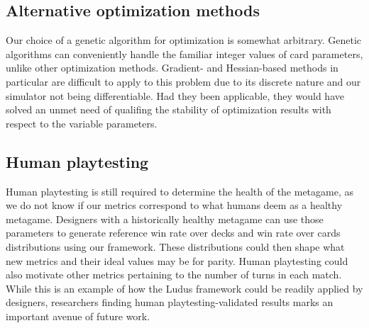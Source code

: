 

\subsection{Alternative optimization methods}

Our choice of a genetic algorithm for optimization is somewhat arbitrary. Genetic algorithms can conveniently 
handle the familiar integer values of card parameters, unlike other optimization methods. Gradient- and Hessian-based
methods in particular are difficult to apply to this problem due to its discrete nature and our simulator not being
differentiable. Had they been applicable, they would have solved an unmet need of qualifing the stability of optimization
results with respect to the variable parameters.

\subsection{Human playtesting}

Human playtesting is still required to determine the health of the metagame, as we do not know if our metrics
correspond to what humans deem as a healthy metagame. Designers
with a historically healthy metagame can use those parameters to generate reference win rate 
over decks and win rate over cards distributions using our framework. These distributions could then shape 
what new metrics and their ideal values may be for parity. Human playtesting could also motivate other metrics pertaining
to the number of turns in each match. While this is an example of how the {\sc Ludus} framework
could be readily applied by designers, researchers finding human playtesting-validated results marks an important avenue of 
future work.

